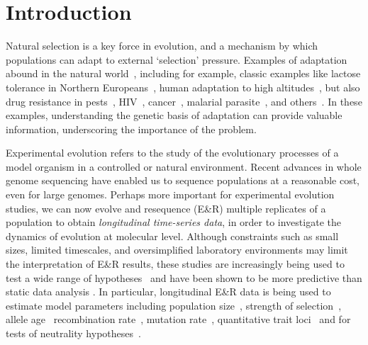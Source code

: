\section{Introduction}
\lettrine[lines=2]{\color{color2}N}{}atural
 selection is a key force in evolution, and a mechanism by
which populations can adapt to external `selection'
pressure. Examples of adaptation abound in the natural
world~\cite{going2016fan}, including for example, classic examples
like lactose tolerance in Northern
Europeans~\cite{bersaglieri2004genetic}, human adaptation to high
altitudes~\cite{yi2010sequencing,simonson2010genetic}, but also drug
resistance in pests~\cite{daborn2001ddt}, HIV~\cite{Feder2016More},
cancer~\cite{gottesman2002mechanisms,zahreddine2013mechanisms},
malarial parasite~\cite{ariey2014molecular,nair2007recurrent}, and
others~\cite{spellberg2008epidemic}. In these examples, understanding
the genetic basis of adaptation can provide valuable information,
underscoring the importance of the problem.


Experimental evolution refers to the study of the evolutionary
processes of a model organism in a controlled
\cite{hegreness2006equivalence,lang2013pervasive,orozco2012adaptation,
  lang2011genetic,barrick2009genome,bollback2007clonal,oz2014strength}
or natural
\cite{maldarelli2013hiv,reid2011new,denef2012situ,winters2012development,
  daniels2013genetic,barrett2008natural,bergland2014genomic}
environment. Recent advances in whole genome sequencing have enabled
us to sequence populations at a reasonable cost, even for large
genomes. Perhaps more important for experimental evolution studies, we
can now evolve and resequence (E\&R) multiple replicates of a population to
obtain \emph{longitudinal time-series data}, in order to investigate
the dynamics of evolution at molecular level.  Although constraints
such as small sizes, limited timescales, and oversimplified
laboratory environments may limit the interpretation of E\&R results,
these studies are increasingly being used to test a wide range of
hypotheses~\cite{kawecki2012experimental} and have been shown to be
more predictive than static data analysis
\cite{boyko2008assessing,desai2008polymorphism,sawyer1992population}.
In particular, longitudinal E\&R data is being used to estimate model
parameters including population
size~\cite{williamson1999using,wang2001pseudo,pollak1983new,waples1989generalized,
  Terhorst2015Multi, jonas2016estimating}, strength of
selection~\cite{mathieson2013estimating,illingworth2011distinguishing,Terhorst2015Multi,
  bollback2008estimation,illingworth2012quantifying,malaspinas2012estimating,
  steinrucken2014novel}, allele age~\cite{malaspinas2012estimating}
recombination rate~\cite{Terhorst2015Multi}, mutation
rate~\cite{Barrick2013Genome, Terhorst2015Multi}, quantitative trait
loci~\cite{baldwin2014power} and for tests of neutrality
hypotheses~\cite{feder2014Identifying,Terhorst2015Multi,burke2010genome,bergland2014genomic}.


